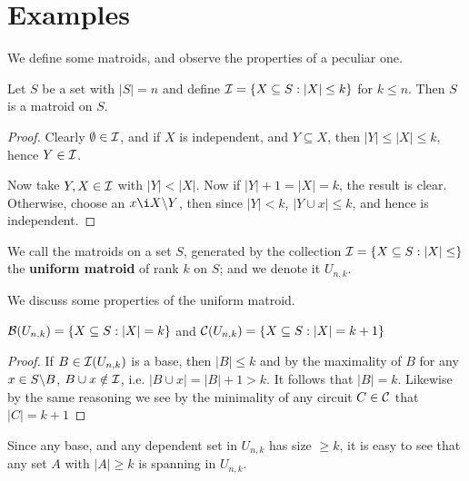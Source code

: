 
\section{Examples}

We define some matroids, and observe the properties of a peculiar one.

\begin{proposition}\label{1.2.1}
    Let $S$ be a set with  $|S|=n$ and define  $\mathcal{I}=\{X \subseteq S: |X| \leq k\}$ for $k \leq n$.
    Then  $S$ is a matroid on  $S$.
\end{proposition}
\begin{proof}
    Clearly $\emptyset \in \mathcal{I}$, and if $X$ is independent, and  $Y \subseteq X$, then  $|Y| \leq
    |X| \leq k$, hence  $Y \in \mathcal{I}$. 

    Now take $Y,X \in \mathcal{I}$ with  $|Y|<|X|$. Now if  $|Y|+1=|X|=k$, the result is clear. Otherwise,
    choose an  $x \i \com{X}{Y}$, then since $|Y|<k$,  $|Y \cup x| \leq k$, and hence is
    independent.
\end{proof}

\begin{definition}
    We call the matroids on a set $S$, generated by the collection  $\mathcal{I}=\{X \subseteq S:|X| \leq
    \}$ the \textbf{uniform matroid} of rank $k$ on  $S$; and we denote it  $U_{n,k}$.
\end{definition}

We discuss some properties of the uniform matroid.

\begin{corollary}
    $\mathcal{B}(U_{n,k})=\{X \subseteq S: |X|=k\}$ and $\mathcal{C}(U_{n,k})=\{X \subseteq S: |X|=k+1\}$
\end{corollary}
\begin{proof}
    If $B \in \mathcal{I}(U_{n,k})$ is a base, then $|B| \leq k$ and by the maximality of $B$ for any $x \in
    S\backslash B$, $B \cup x \notin \mathcal{I}$, i.e.  $|B \cup x|=|B|+1>k$. It follows that  $|B|=k$.
    Likewise by the same reasoning we see by the minimality of any circuit $C \in \mathcal{C}$ that $|C|=k+1$
\end{proof}
\begin{remark}
    Since any base, and any dependent set in $U_{n,k}$ has size $\geq k$, it is easy to see that any
    set  $A$ with  $|A| \geq k$ is spanning in  $U_{n,k}$.
\end{remark}

